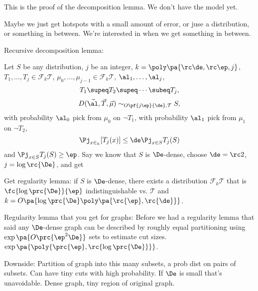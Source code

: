 This is the proof of the decomposition lemma. We don't have the model yet.

Maybe we just get hotspots with a small amount of error, or juse a distribution, or something in between. We're interested in when we get something in between.

Recursive decomposition lemma: 

Let $S$ be any distribution, $j$ be an integer, $k=\poly\pa{\rc\de, \rc \ep, j}$, $T_1,\ldots, T_j \in \mathcal F_k \mathcal T$, $\mu_0,\ldots, \mu_{j-1}\in \mathcal F_k\mathcal  T$, $\al_1,\ldots, \al_j$,
$$
T_1\supeq T_2\supeq \cdots \subeq T_j,
$$
$$D(\vec\al, \vec T, \vec\mu) \sim_{O\pf{j\ep}{\de}, \mathcal T} S,
$$
 with probability $\al_0$ pick from $\mu_0$ on $\neg T_1$, with probability $\al_1$ pick  from $\mu_1$ on $\neg T_2$, 
 $$
 \Pj_{x\in_h} [T_{j}(x)] \le \de  \Pj_{x\in S}T_j(S)
 $$%
 and $\Pj_{x\in S} T_j(S) \ge \ep$.
 Say we know that $S$ is $\De$-dense, choose $\de=\rc 2$, $j=\log \rc{\De}$, and get 
 
Get regularity lemma: if $S$ is $\De$-dense, there exists a distribution $\mathcal F_k \mathcal T$ that is $\fc{\log \prc{\De}}{\ep}$ %
indistinguishable vs. $\mathcal T$ and $k=O\pa{\log \prc{\De}\poly\pa{\rc{\ep}, \rc{\de}}}$.

Regularity lemma that you get for graphs: Before we had a regularity lemma that said any $\De$-dense graph can be described by roughly equal partitioning using $\exp\pa{O\prc{\ep^2\De}}$ sets to estimate cut sizes. 
$\exp\pa{\poly{\prc{\ep}, %
 \rc{\log\prc{\De}}}}$.

Downside:  Partition of graph into this many subsets, a prob dist on pairs of subsets. Can have tiny cuts with high probability. If $\De$ is small that's unavoidable. Dense graph, tiny region of original graph.